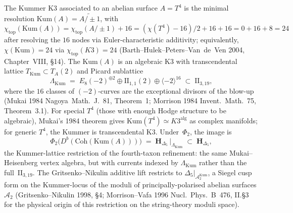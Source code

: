 \begin{remark}
\label{rem:dcy-kummer}
The Kummer K3 associated to an abelian surface $A = T^4$ is the
minimal resolution $\mathrm{Kum}(A) = \widetilde{A/\pm 1}$, with
$\chi_{\mathrm{top}}(\mathrm{Kum}(A)) = \chi_{\mathrm{top}}(A/\pm 1) + 16
 = (\chi(T^4) - 16)/2 + 16 + 16 = 0 + 16 + 8 = 24$ after resolving
the $16$ nodes via Euler-characteristic additivity; equivalently,
$\chi(\mathrm{Kum}) = 24$ via $\chi_{\mathrm{top}}(K3) = 24$
(Barth--Hulek--Peters--Van~de~Ven 2004, Chapter~VIII, \S14). The
$\mathrm{Kum}(A)$ is an algebraic K3 with transcendental
lattice $T_{\mathrm{Kum}} \subset T_A(2)$ and Picard sublattice
\[
 \Lambda_{\mathrm{Kum}}
 \;=\;
 E_8(-2)^{\oplus 2} \oplus \mathrm{II}_{1,1}(2) \oplus \langle -2\rangle^{16}
 \;\subset\;
 \mathrm{II}_{3,19},
\]
where the $16$ classes of $(-2)$-curves are the exceptional
divisors of the blow-up (Mukai 1984 \textup{Nagoya~Math.~J.}~81,
Theorem~1; Morrison 1984 \textup{Invent.~Math.}~75, Theorem~3.1).
For special $T^4$ (those with enough Hodge structure to be
algebraic), Mukai's 1984 theorem gives
$\mathrm{Kum}(T^4) \simeq K3^{\mathrm{alg}}$ as complex manifolds;
for generic $T^4$, the Kummer is transcendental K3. Under~$\Phi_2$,
the image is
\[
 \Phi_2\bigl(D^b(\mathrm{Coh}(\mathrm{Kum}(A)))\bigr)
 \;=\;
 \mathbf{H}_{\Delta_5}\,\big|_{\Lambda_{\mathrm{Kum}}}
 \;\subset\;
 \mathbf{H}_{\Delta_5},
\]
the Kummer-lattice restriction of the fourth-taxon refinement: the
same Mukai--Heisenberg vertex algebra, but with currents indexed by
$\Lambda_{\mathrm{Kum}}$ rather than the full~$\mathrm{II}_{3,19}$.
The Gritsenko--Nikulin additive lift restricts to
$\Delta_5\big|_{\mathcal{A}_2^{\mathrm{Kum}}}$, a Siegel cusp form
on the Kummer-locus of the moduli of principally-polarised abelian
surfaces $\mathcal{A}_2$ (Gritsenko--Nikulin 1998, \S 4;
Morrison--Vafa 1996 \textup{Nucl.~Phys.~B}~476, II.\S3 for the
physical origin of this restriction on the string-theory moduli
space).
\end{remark}

